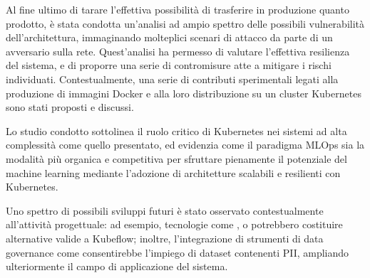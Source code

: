 Al fine ultimo di tarare l'effettiva possibilità di trasferire in produzione quanto prodotto, è stata condotta un'analisi ad ampio spettro delle possibili vulnerabilità dell'architettura, immaginando molteplici scenari di attacco da parte di un avversario sulla rete. Quest'analisi ha permesso di valutare l'effettiva resilienza del sistema, e di proporre una serie di contromisure atte a mitigare i rischi individuati. Contestualmente, una serie di contributi sperimentali legati alla produzione di immagini Docker e alla loro distribuzione su un cluster Kubernetes sono stati proposti e discussi.

Lo studio condotto sottolinea il ruolo critico di Kubernetes nei sistemi ad alta complessità come quello presentato, ed evidenzia come il paradigma MLOps sia la modalità più organica e competitiva per sfruttare pienamente il potenziale del machine learning mediante l'adozione di architetture scalabili e resilienti con Kubernetes.

Uno spettro di possibili sviluppi futuri è stato osservato contestualmente all'attività progettuale: ad esempio, tecnologie come ,  o  potrebbero costituire alternative valide a Kubeflow; inoltre, l'integrazione di strumenti di data governance come  consentirebbe l'impiego di dataset contenenti PII, ampliando ulteriormente il campo di applicazione del sistema.